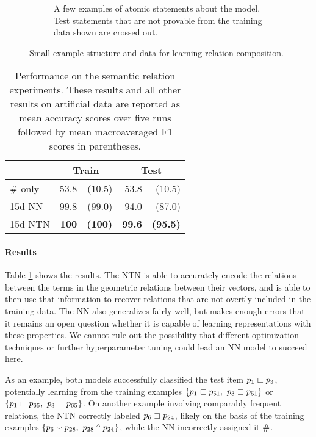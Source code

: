 \begin{figure}[t]
\begin{subfigure}[t]{0.43\textwidth}
\begin{tabular}[b]{c  c}
      \bottomrule
    \end{tabular}

    \caption{A few examples of atomic statements about the
      model.  Test statements that are not provable from the training data shown are
      crossed out.}
  \end{subfigure}  
  \caption{Small example structure and data for learning relation composition.}
  \label{lattice-figure}
\end{figure} 

\begin{table}[tp]
  \centering\small
  \begin{tabular}{ l r@{ \ }r r@{ \ }r }
    \toprule
    ~&\multicolumn{2}{c}{Train} & \multicolumn{2}{c}{Test}\\
    \midrule
    $\mathbin{\#}$ only &53.8 &(10.5)    &53.8 &(10.5) \\
    15d NN &				99.8&	(99.0) &94.0&(87.0) \\
    15d NTN 				& \textbf{100} & \textbf{(100)} & \textbf{99.6} & \textbf{(95.5)}\\
    \bottomrule
  \end{tabular}
  
  
  \caption{Performance on the semantic relation experiments. These results and all other results on artificial data are reported as mean accuracy scores over five runs followed by mean macroaveraged F1 scores in parentheses.}
  \label{joinresultstable}
\end{table}

\paragraph{Results} 
Table \ref{joinresultstable} shows the results. 
The NTN is able to accurately encode the relations 
between the terms in the geometric relations between their vectors, 
and is able to then use that information to recover relations that 
are not overtly included in the training data. The NN also generalizes fairly well, 
but makes enough errors that it remains an open question whether 
it is capable of learning representations with these properties. 
We cannot rule out the possibility that different optimization techniques or
further hyperparameter tuning could lead an NN model to succeed here.

As an example, both models successfully classified the test item $p_1 \sqsubset p_3$, potentially learning from the training examples $\{p_1 \sqsubset p_{51},~p_3 \sqsupset p_{51}\}$ or $\{p_1\sqsubset p_{65},~p_3 \sqsupset p_{65} \}$. On another example involving comparably frequent relations, the NTN correctly labeled $p_6 \sqsupset p_{24}$, likely on the basis of the training examples $\{p_6 \mathbin{\smallsmile} p_{28},~p_{28} \mathbin{^{\wedge}} p_{24}\}$, while the NN incorrectly assigned it $\mathbin{\#}$.

